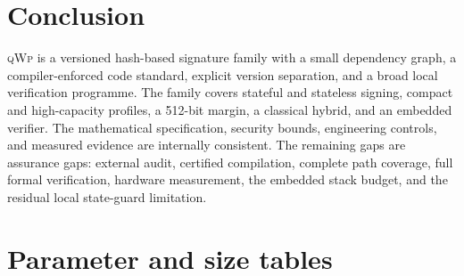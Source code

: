 \documentclass[11pt,a4paper]{article}
\theoremstyle{remark}
\newcommand{\qwp}{\textsc{qWp}}
\begin{document}
\section{Conclusion}

\qwp{} is a versioned hash-based signature family with a small dependency graph,
a compiler-enforced code standard, explicit version separation, and a broad local
verification programme. The family covers stateful and stateless signing,
compact and high-capacity profiles, a 512-bit margin, a classical hybrid, and an
embedded verifier. The mathematical specification, security bounds, engineering
controls, and measured evidence are internally consistent. The remaining gaps
are assurance gaps: external audit, certified compilation, complete path
coverage, full formal verification, hardware measurement, the embedded stack
budget, and the residual local state-guard limitation.

\appendix

\section{Parameter and size tables}
\end{document}
